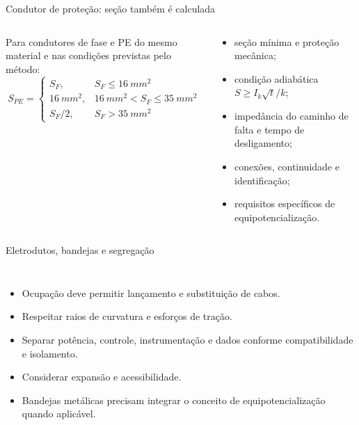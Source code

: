 \begin{frame}{Condutor de proteção: seção também é calculada}
\small
\begin{columns}[T,onlytextwidth]
\begin{caixaNorma}[title=Método tabular simplificado]
Para condutores de fase e PE do mesmo material e nas condições previstas pelo método:
\[
S_{PE}=\begin{cases}
S_F, & S_F\le\SI{16}{mm^2}\\
\SI{16}{mm^2}, & \SI{16}{mm^2}<S_F\le\SI{35}{mm^2}\\
S_F/2, & S_F>\SI{35}{mm^2}
\end{cases}
\]
\end{caixaNorma}
\begin{caixaAt}[title=O que ainda precisa fechar]
\begin{itemize}
\item seção mínima e proteção mecânica;
\item condição adiabática $S\ge I_k\sqrt{t}/k$;
\item impedância do caminho de falta e tempo de desligamento;
\item conexões, continuidade e identificação;
\item requisitos específicos de equipotencialização.
\end{itemize}
\end{caixaAt}
\end{columns}
\end{frame}

\begin{frame}{Eletrodutos, bandejas e segregação}
\small
\begin{columns}[T,onlytextwidth]
\begin{itemize}
\item Ocupação deve permitir lançamento e substituição de cabos.
\item Respeitar raios de curvatura e esforços de tração.
\item Separar potência, controle, instrumentação e dados conforme compatibilidade e isolamento.
\item Considerar expansão e acessibilidade.
\item Bandejas metálicas precisam integrar o conceito de equipotencialização quando aplicável.
\end{itemize}
\centering
{}
\end{columns}
\end{frame}

